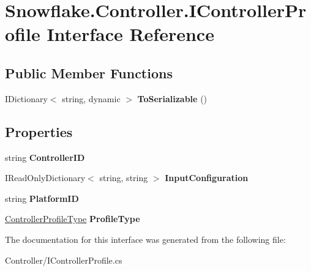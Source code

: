 \hypertarget{interface_snowflake_1_1_controller_1_1_i_controller_profile}{}\section{Snowflake.\+Controller.\+I\+Controller\+Profile Interface Reference}
\label{interface_snowflake_1_1_controller_1_1_i_controller_profile}
\subsection*{Public Member Functions}
\begin{DoxyCompactItemize}
\item 
\hypertarget{interface_snowflake_1_1_controller_1_1_i_controller_profile_a41a6f6f8c58ec249821ef77e58c5d718}{}I\+Dictionary$<$ string, dynamic $>$ {\bfseries To\+Serializable} ()\label{interface_snowflake_1_1_controller_1_1_i_controller_profile_a41a6f6f8c58ec249821ef77e58c5d718}

\end{DoxyCompactItemize}
\subsection*{Properties}
\begin{DoxyCompactItemize}
\item 
\hypertarget{interface_snowflake_1_1_controller_1_1_i_controller_profile_a092d06272423ca9603f422361c796991}{}string {\bfseries Controller\+I\+D}\label{interface_snowflake_1_1_controller_1_1_i_controller_profile_a092d06272423ca9603f422361c796991}

\item 
\hypertarget{interface_snowflake_1_1_controller_1_1_i_controller_profile_ab4099e38a03cdd075a368d169ccbe6b4}{}I\+Read\+Only\+Dictionary$<$ string, string $>$ {\bfseries Input\+Configuration}\label{interface_snowflake_1_1_controller_1_1_i_controller_profile_ab4099e38a03cdd075a368d169ccbe6b4}

\item 
\hypertarget{interface_snowflake_1_1_controller_1_1_i_controller_profile_a8427942ab6807a76853f9992488831ff}{}string {\bfseries Platform\+I\+D}\label{interface_snowflake_1_1_controller_1_1_i_controller_profile_a8427942ab6807a76853f9992488831ff}

\item 
\hypertarget{interface_snowflake_1_1_controller_1_1_i_controller_profile_a4822ec076ec75e9895714a87231e3a6c}{}\hyperlink{namespace_snowflake_1_1_controller_af6896d98053b4f8f2d42c32c6fb05c96}{Controller\+Profile\+Type} {\bfseries Profile\+Type}\label{interface_snowflake_1_1_controller_1_1_i_controller_profile_a4822ec076ec75e9895714a87231e3a6c}

\end{DoxyCompactItemize}


The documentation for this interface was generated from the following file\+:\begin{DoxyCompactItemize}
\item 
Controller/I\+Controller\+Profile.\+cs\end{DoxyCompactItemize}
